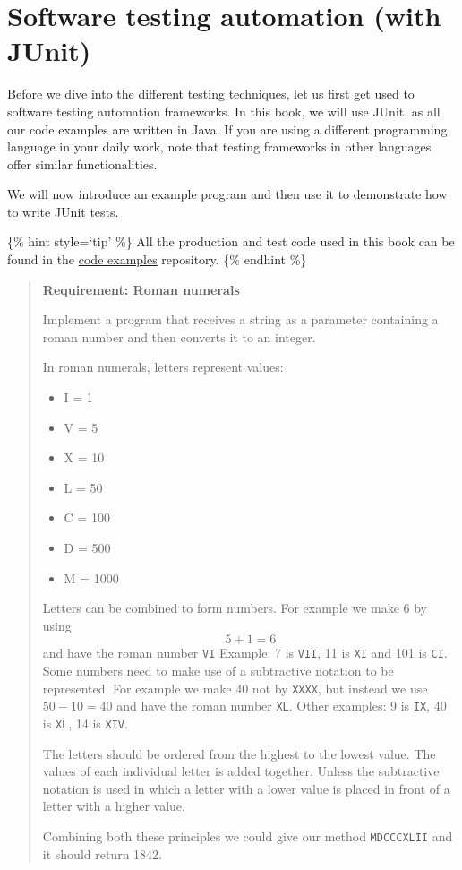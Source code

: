 \hypertarget{software-testing-automation-with-junit}{%
\section{Software testing automation (with
JUnit)}\label{software-testing-automation-with-junit}}

Before we dive into the different testing techniques, let us first get
used to software testing automation frameworks. In this book, we will
use JUnit, as all our code examples are written in Java. If you are
using a different programming language in your daily work, note that
testing frameworks in other languages offer similar functionalities.

We will now introduce an example program and then use it to demonstrate
how to write JUnit tests.

\{\% hint style=`tip' \%\} All the production and test code used in this
book can be found in the
\href{https://github.com/sttp-book/code-examples/}{code examples}
repository. \{\% endhint \%\}

\begin{quote}
\textbf{Requirement: Roman numerals}

Implement a program that receives a string as a parameter containing a
roman number and then converts it to an integer.

In roman numerals, letters represent values:

\begin{itemize}
\tightlist
\item
  I = 1
\item
  V = 5
\item
  X = 10
\item
  L = 50
\item
  C = 100
\item
  D = 500
\item
  M = 1000
\end{itemize}

Letters can be combined to form numbers. For example we make 6 by using
\[5 + 1 = 6\] and have the roman number \texttt{VI} Example: 7 is
\texttt{VII}, 11 is \texttt{XI} and 101 is \texttt{CI}. Some numbers
need to make use of a subtractive notation to be represented. For
example we make 40 not by \texttt{XXXX}, but instead we use
\(50 - 10 = 40\) and have the roman number \texttt{XL}. Other examples:
9 is \texttt{IX}, 40 is \texttt{XL}, 14 is \texttt{XIV}.

The letters should be ordered from the highest to the lowest value. The
values of each individual letter is added together. Unless the
subtractive notation is used in which a letter with a lower value is
placed in front of a letter with a higher value.

Combining both these principles we could give our method
\texttt{MDCCCXLII} and it should return 1842.
\end{quote}

